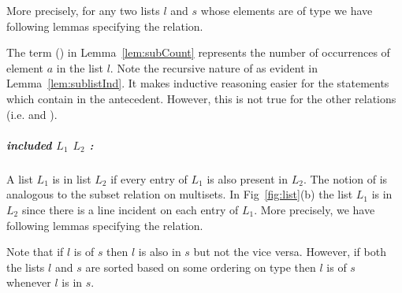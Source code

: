 \documentclass[a4paper,UKenglish,cleveref, autoref]{lipics-v2019}
\begin{document}
More precisely,  for any two lists $l$ and $s$ whose elements are of type  we have following lemmas specifying the  relation.

\begin{lemma} 
\end{lemma}
\begin{lemma}\label{lem:sublistInd} 
\end{lemma}
\begin{lemma}\label{lem:subCount} 
\end{lemma}

The term (\emph{}) in Lemma~\ref{lem:subCount}  represents the number of occurrences of element $a$ in the list $l$. Note the recursive nature of  as evident in Lemma~\ref{lem:sublistInd}. It  makes inductive reasoning easier for the statements which contain  in the antecedent. However, this is  not true for the other relations (i.e.  and ).

\subparagraph*{included $L_1$ $L_2$ :} A list $L_1$ is  in  list $L_2$ if every entry of $L_1$ is also present in $L_2$. The notion of   is analogous to the subset relation on multisets. In Fig~\ref{fig:list}(b) the list $L_1$ is  in $L_2$ since there is a line incident on each entry of $L_1$. More precisely, we have following lemmas specifying the  relation.
\begin{lemma}
\end{lemma}
\begin{lemma}
\end{lemma}
\begin{lemma}
\end{lemma}

Note that if $l$ is  of $s$ then $l$ is also  in $s$ but not the vice versa. However, if both the lists $l$ and $s$ are sorted based on some ordering on type  then $l$ is  of $s$ whenever $l$ is  in $s$.
\begin{lemma}
\end{lemma}
\end{document}

